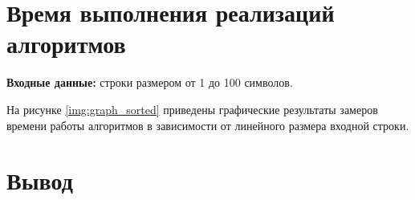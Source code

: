 \section{Время выполнения реализаций алгоритмов}

\textbf{Входные данные:} строки размером от 1 до 100 символов.

 На рисунке \ref{img:graph_sorted} приведены графические результаты замеров времени работы алгоритмов в зависимости от линейного размера входной строки.

\begin{center}
	\label{img:graph_sorted}
\end{center}





\section{Вывод}

